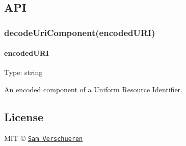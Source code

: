 \subsection*{A\+PI}

\subsubsection*{decode\+Uri\+Component(encoded\+U\+R\+I)}

\paragraph*{encoded\+U\+RI}

Type\+: {\ttfamily string}

An encoded component of a Uniform Resource Identifier.

\subsection*{License}

M\+IT © \href{https://github.com/SamVerschueren}{\tt Sam Verschueren} 